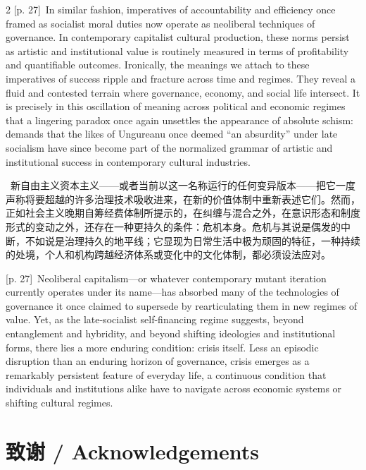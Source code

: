 \documentclass[10pt,a4paper]{article}
\begin{document}
\begin{paracol}{2}
{\scriptsize\color{gray} [p. 27]}\ In similar fashion, imperatives of accountability and efficiency once framed as socialist moral duties now operate as neoliberal techniques of governance. In contemporary capitalist cultural production, these norms persist as artistic and institutional value is routinely measured in terms of profitability and quantifiable outcomes. Ironically, the meanings we attach to these imperatives of success ripple and fracture across time and regimes. They reveal a fluid and contested terrain where governance, economy, and social life intersect. It is precisely in this oscillation of meaning across political and economic regimes that a lingering paradox once again unsettles the appearance of absolute schism: demands that the likes of Ungureanu once deemed “an absurdity” under late socialism have since become part of the normalized grammar of artistic and institutional success in contemporary cultural industries.\par
\switchcolumn*
{\scriptsize\color{gray} [p. 27]}\ 新自由主义资本主义——或者当前以这一名称运行的任何变异版本——把它一度声称将要超越的许多治理技术吸收进来，在新的价值体制中重新表述它们。然而，正如社会主义晚期自筹经费体制所提示的，在纠缠与混合之外，在意识形态和制度形式的变动之外，还存在一种更持久的条件：危机本身。危机与其说是偶发的中断，不如说是治理持久的地平线；它显现为日常生活中极为顽固的特征，一种持续的处境，个人和机构跨越经济体系或变化中的文化体制，都必须设法应对。\par
\switchcolumn
{\scriptsize\color{gray} [p. 27]}\ Neoliberal capitalism—or whatever contemporary mutant iteration currently operates under its name—has absorbed many of the technologies of governance it once claimed to supersede by rearticulating them in new regimes of value. Yet, as the late-socialist self-financing regime suggests, beyond entanglement and hybridity, and beyond shifting ideologies and institutional forms, there lies a more enduring condition: crisis itself. Less an episodic disruption than an enduring horizon of governance, crisis emerges as a remarkably persistent feature of everyday life, a continuous condition that individuals and institutions alike have to navigate across economic systems or shifting cultural regimes.\par
\switchcolumn*
\end{paracol}
\section*{致谢 / Acknowledgements}
\end{document}
